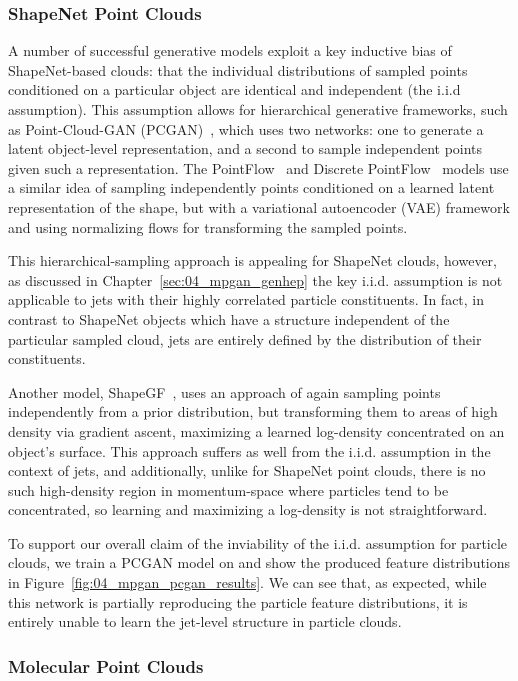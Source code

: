 \subsubsection{ShapeNet Point Clouds}
A number of successful generative models exploit a key inductive bias of ShapeNet-based clouds: that the individual distributions of sampled points conditioned on a particular object are identical and independent (the i.i.d assumption).
This assumption allows for hierarchical generative frameworks, such as Point-Cloud-GAN (PCGAN)~\cite{pcgan}, which uses two networks: one to generate a latent object-level representation, and a second to sample independent points given such a representation.
The PointFlow~\cite{pointflow} and Discrete PointFlow~\cite{discretepointflow} models use a similar idea of sampling independently points conditioned on a learned latent representation of the shape, but with a variational autoencoder (VAE) framework and using normalizing flows for transforming the sampled points.

This hierarchical-sampling approach is appealing for ShapeNet clouds, however, as discussed in Chapter~\ref{sec:04_mpgan_genhep} the key i.i.d. assumption is not applicable to jets with their highly correlated particle constituents.
In fact, in contrast to ShapeNet objects which have a structure independent of the particular sampled cloud, jets are entirely defined by the distribution of their constituents.

Another model, ShapeGF~\cite{ShapeGF}, uses an approach of again sampling points independently from a prior distribution, but transforming them to areas of high density via gradient ascent, maximizing a learned log-density concentrated on an object's surface.
This approach suffers as well from the i.i.d. assumption in the context of jets, and additionally, unlike for ShapeNet point clouds, there is no such high-density region in momentum-space where particles tend to be concentrated, so learning and maximizing a log-density is not straightforward.

To support our overall claim of the inviability of the i.i.d. assumption for particle clouds, we train a PCGAN model on \jetnet and show the produced feature distributions in Figure~\ref{fig:04_mpgan_pcgan_results}.
We can see that, as expected, while this network is partially reproducing the particle feature distributions, it is entirely unable to learn the jet-level structure in particle clouds.

\subsubsection{Molecular Point Clouds}

